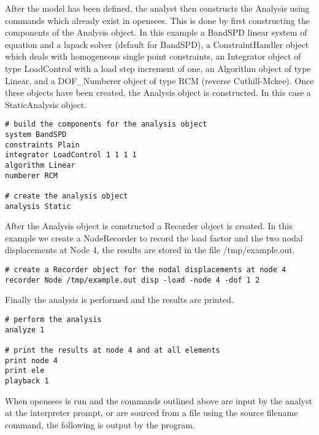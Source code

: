 \documentclass[12pt]{article}
\begin{document}
After the model has been defined, the analyst then constructs the
Analysis using commands which already exist in opensees. This is done by
first constructing the components of the Analysis object. In this
example a BandSPD linear system of equation and a lapack solver
(default for BandSPD), a ConstraintHandler object which deals with
homogeneous single point constraints, an Integrator object of type
LoadControl with a load step increment of one, an Algorithm object of
type Linear, and a DOF\_Numberer object of type RCM (reverse
Cuthill-Mckee). Once these objects have been created, the Analysis
object is constructed. In this case a StaticAnalysis object.

{\sf\small \begin{verbatim}
# build the components for the analysis object
system BandSPD
constraints Plain
integrator LoadControl 1 1 1 1
algorithm Linear
numberer RCM

# create the analysis object 
analysis Static 
\end{verbatim} }

After the Analysis object is constructed a Recorder object is
created. In this example we create a NodeRecorder to record the
load factor and the two nodal displacements at Node 4, the results are
stored in the file {\sf /tmp/example.out}.

{\sf\small \begin{verbatim}
# create a Recorder object for the nodal displacements at node 4
recorder Node /tmp/example.out disp -load -node 4 -dof 1 2
\end{verbatim} }

Finally the analysis is performed and the results are printed. 

{\sf\small \begin{verbatim}
# perform the analysis
analyze 1

# print the results at node 4 and at all elements
print node 4
print ele
playback 1
\end{verbatim} }

When opensees is run and the commands outlined above are input by the analyst at the
interpreter prompt, or are sourced from a file using the {\sf source
filename} command, the following is output by the program. 
\end{document}
